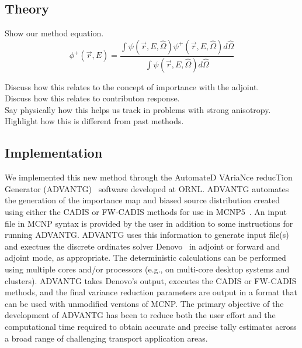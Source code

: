 \documentclass[12pt]{article}
\begin{document}
\subsection{Theory}
\label{subsect::theory}

Show our method equation. \\


\begin{equation} 
\label{eq:angularhybrid}
\phi^{+}(\vec{r},E) = \frac{\int \psi(\vec {r} ,E,\hat{\Omega})\psi^+(\vec {r} ,E,\hat{\Omega})d\hat\Omega }{\int\psi(\vec {r} ,E,\hat{\Omega})d\hat\Omega}
\end{equation}


Discuss how this relates to the concept of importance with the adjoint. \\
Discuss how this relates to contributon response. \\
Say physically how this helps us track in problems with strong anisotropy. \\
Highlight how this is different from past methods.

%

\subsection{Implementation}
\label{subsect::implementation}

We implemented this new method through the AutomateD VAriaNce reducTion Generator (ADVANTG)~\cite{wagner_automated_2002, mosher_new_2010} software developed at ORNL. 
ADVANTG automates the generation of the importance map and biased source distribution created using either the CADIS or FW-CADIS methods for use in MCNP5~\cite{brown_mcnp_2002}. 
An input file in MCNP syntax is provided by the user in addition to some instructions for running ADVANTG. 
ADVANTG uses this information to generate input file(s) and exectues the discrete ordinates solver Denovo~\cite{evans_denovo:_2010} in adjoint or forward and adjoint mode, as appropriate.
The deterministic calculations can be performed using multiple cores and/or processors (e.g., on multi-core desktop systems and clusters). 
ADVANTG takes Denovo's output, executes the CADIS or FW-CADIS methods, and the final variance reduction parameters are output in a format that can be used with unmodified versions of MCNP. 
The primary objective of the development of ADVANTG has been to reduce both the user effort and the computational time required to obtain accurate and precise tally estimates
across a broad range of challenging transport application areas.
\end{document}

